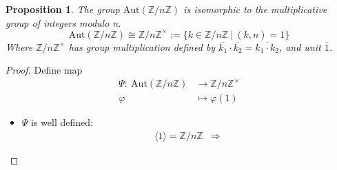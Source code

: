 \documentclass{article}
\newtheorem{theorem}{Proposition}[section]
\theoremstyle{definition}
\theoremstyle{remark}
\begin{document}
\begin{theorem}
The group $\mathrm{Aut}(\mathbb{Z}/n\mathbb{Z})$ is isomorphic to the multiplicative group of integers modulo n.
\begin{equation}
\mathrm{Aut}(\mathbb{Z}/n\mathbb{Z})\cong\mathbb{Z}/n\mathbb{Z}^{\times}:=\lbrace k\in\mathbb{Z}/n\mathbb{Z}~|~(k,n)=1\rbrace
\end{equation}
Where $\mathbb{Z}/n\mathbb{Z}^{\times}$ has group multiplication defined by $\overline{k_1}\cdot \overline{k_2}=\overline{k_1\cdot k_2}$, and unit $\overline{1}$.\\
\end{theorem}
\begin{proof}
Define map 
\begin{align*}
\Psi:~\mathrm{Aut}(\mathbb{Z}/n\mathbb{Z})&\rightarrow\mathbb{Z}/n\mathbb{Z}^{\times}\\
\varphi&\mapsto\varphi(1)
\end{align*}
\begin{itemize}
\item $\Psi$ is well defined:
\begin{align*}
\langle 1 \rangle = \mathbb{Z}/n\mathbb{Z}&\Rightarrow
\end{align*}
\end{itemize}
\end{proof}
\end{document}
